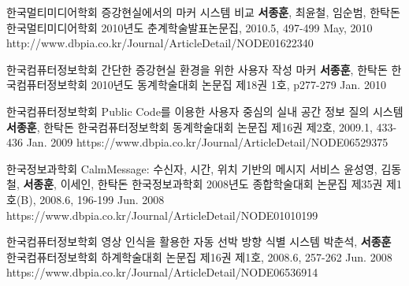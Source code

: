 \begin{cventries}
  \cvpublicationentry
    {한국멀티미디어학회} %
    {증강현실에서의 마커 시스템 비교} %
    {\textbf{서종훈}, 최윤철, 임순범, 한탁돈} %
    {한국멀티미디어학회 2010년도 춘계학술발표논문집, 2010.5, 497-499}
    {May, 2010} %
    {http://www.dbpia.co.kr/Journal/ArticleDetail/NODE01622340} 

  \cvpublicationentry
    {한국컴퓨터정보학회} %
    {간단한 증강현실 환경을 위한 사용자 작성 마커} %
    {\textbf{서종훈}, 한탁돈} %
    {한국컴퓨터정보학회 2010년도 동계학술대회 논문집 제18권 1호, p277-279}
    {Jan. 2010} %
    {}

  \cvpublicationentry
    {한국컴퓨터정보학회} %
    {Public Code를 이용한 사용자 중심의 실내 공간 정보 질의 시스템} %
    {\textbf{서종훈}, 한탁돈} %
    {한국컴퓨터정보학회 동계학술대회 논문집 제16권 제2호, 2009.1, 433-436}
    {Jan. 2009} %
    {https://www.dbpia.co.kr/Journal/ArticleDetail/NODE06529375}

  \cvpublicationentry
    {한국정보과학회} %
    {CalmMessage: 수신자, 시간, 위치 기반의 메시지 서비스} %
    {윤성영, 김동철, \textbf{서종훈}, 이세인, 한탁돈} %
    {한국정보과학회 2008년도 종합학술대회 논문집 제35권 제1호(B), 2008.6, 196-199}
    {Jun. 2008} %
    {https://www.dbpia.co.kr/Journal/ArticleDetail/NODE01010199}

  \cvpublicationentry
    {한국컴퓨터정보학회} %
    {영상 인식을 활용한 자동 선박 방향 식별 시스템} %
    {박춘석, \textbf{서종훈}} %
    {한국컴퓨터정보학회 하계학술대회 논문집 제16권 제1호, 2008.6, 257-262}
    {Jun. 2008} %
    {https://www.dbpia.co.kr/Journal/ArticleDetail/NODE06536914}


\end{cventries}
